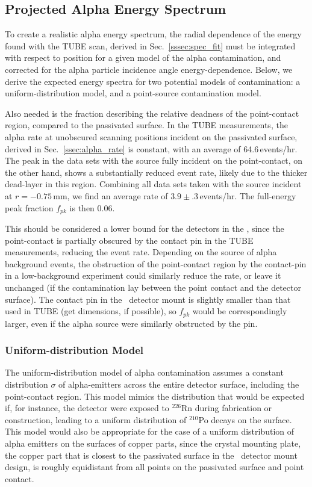 \subsection{Projected Alpha Energy Spectrum}\label{ssec:alpha_model}
To create a realistic alpha energy spectrum, the radial dependence of the energy found with the TUBE scan, derived in Sec.~\ref{sssec:spec_fit} must be integrated with respect to position for a given model of the alpha contamination, and corrected for the alpha particle incidence angle energy-dependence. Below, we derive the expected energy spectra for two potential models of contamination: a uniform-distribution model, and a point-source contamination model.  

Also needed is the fraction describing the relative deadness of the point-contact region, compared to the passivated surface. In the TUBE measurements, the alpha rate at unobscured scanning positions incident on the passivated surface, derived in Sec.~\ref{ssec:alpha_rate} is constant, with an average of 64.6\,events/hr. The peak in the data sets with the source fully incident on the point-contact, on the other hand, shows a substantially reduced event rate, likely due to the thicker dead-layer in this region. Combining all data sets taken with the source incident at $r=-0.75$\,mm, we find an average rate of $3.9\pm.3$\,events/hr. The full-energy peak fraction $f_{pk}$ is then 0.06. 

This should be considered a lower bound for the detectors in the \DEM , since the point-contact is partially obscured by the contact pin in the TUBE measurements, reducing the event rate. Depending on the source of alpha background events, the obstruction of the point-contact region by the contact-pin in a low-background experiment could similarly reduce the rate, or leave it unchanged (if the contamination lay between the point contact and the detector surface). The contact pin in the \MJ\ detector mount is slightly smaller than that used in TUBE (get dimensions, if possible), so $f_{pk}$ would be correspondingly larger, even if the alpha source were similarly obstructed by the pin.

\subsubsection{Uniform-distribution Model}
The uniform-distribution model of alpha contamination assumes a constant distribution $\sigma$ of alpha-emitters across the entire detector surface, including the point-contact region. This model mimics the distribution that would be expected if, for instance, the detector were exposed to $^{226}$Rn during fabrication or construction, leading to a uniform distribution of $^{210}$Po decays on the surface. This model would also be appropriate for the case of a uniform distribution of alpha emitters on the surfaces of copper parts, since the crystal mounting plate, the copper part that is closest to the passivated surface in the \MJ\ detector mount design, is roughly equidistant from all points on the passivated surface and point contact. 

